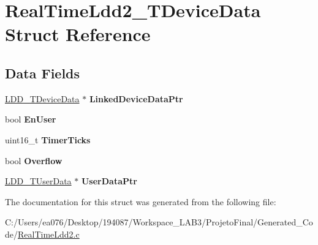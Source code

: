 \hypertarget{struct_real_time_ldd2___t_device_data}{\section{Real\-Time\-Ldd2\-\_\-\-T\-Device\-Data Struct Reference}
\label{struct_real_time_ldd2___t_device_data}
}
\subsection*{Data Fields}
\begin{DoxyCompactItemize}
\item 
\hypertarget{struct_real_time_ldd2___t_device_data_ad14020f50e9d11a144506a5ff470472d}{\hyperlink{group___p_e___types__module_gac5cf1362f1f0e3a2ce71b1bf2276d091}{L\-D\-D\-\_\-\-T\-Device\-Data} $\ast$ {\bfseries Linked\-Device\-Data\-Ptr}}\label{struct_real_time_ldd2___t_device_data_ad14020f50e9d11a144506a5ff470472d}

\item 
\hypertarget{struct_real_time_ldd2___t_device_data_aca339fd33aaa888c2cb9e4dbb2fea893}{bool {\bfseries En\-User}}\label{struct_real_time_ldd2___t_device_data_aca339fd33aaa888c2cb9e4dbb2fea893}

\item 
\hypertarget{struct_real_time_ldd2___t_device_data_ab55747b85a507e247afeefd0e9c3f626}{uint16\-\_\-t {\bfseries Timer\-Ticks}}\label{struct_real_time_ldd2___t_device_data_ab55747b85a507e247afeefd0e9c3f626}

\item 
\hypertarget{struct_real_time_ldd2___t_device_data_a31b4cf77e61c983df0d206b286e482c1}{bool {\bfseries Overflow}}\label{struct_real_time_ldd2___t_device_data_a31b4cf77e61c983df0d206b286e482c1}

\item 
\hypertarget{struct_real_time_ldd2___t_device_data_a5f0373845e2edb1bd330c0b05448c45c}{\hyperlink{group___p_e___types__module_ga0b66a73f87238a782318aa0be7578e35}{L\-D\-D\-\_\-\-T\-User\-Data} $\ast$ {\bfseries User\-Data\-Ptr}}\label{struct_real_time_ldd2___t_device_data_a5f0373845e2edb1bd330c0b05448c45c}

\end{DoxyCompactItemize}


The documentation for this struct was generated from the following file\-:\begin{DoxyCompactItemize}
\item 
C\-:/\-Users/ea076/\-Desktop/194087/\-Workspace\-\_\-\-L\-A\-B3/\-Projeto\-Final/\-Generated\-\_\-\-Code/\hyperlink{_real_time_ldd2_8c}{Real\-Time\-Ldd2.\-c}\end{DoxyCompactItemize}
